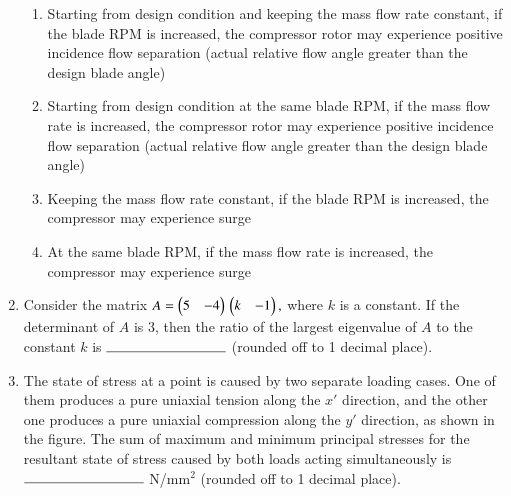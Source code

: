 \documentclass[journal,12pt,onecolumn]{IEEEtran}
\theoremstyle{remark}
\begin{document}
\begin{enumerate}
    \begin{enumerate}
        \item Starting from design condition and keeping the mass flow rate constant, if the blade RPM is increased, the compressor rotor may experience positive incidence flow separation (actual relative flow angle greater than the design blade angle)
        \item Starting from design condition at the same blade RPM, if the mass flow rate is increased, the compressor rotor may experience positive incidence flow separation (actual relative flow angle greater than the design blade angle)
        \item Keeping the mass flow rate constant, if the blade RPM is increased, the compressor may experience surge
        \item At the same blade RPM, if the mass flow rate is increased, the compressor may experience surge
    \end{enumerate}
    
    \item Consider the matrix 
    $
    A = \begin{pmatrix} 5 & -4 \end{pmatrix}\\ \begin{pmatrix}k & -1\end{pmatrix} ,
    $
    where $k$ is a constant. If the determinant of $A$ is 3, then the ratio of the largest eigenvalue of $A$ to the constant $k$ is $\rule{3cm}{0.15mm}$ (rounded off to 1 decimal place).
    
    \item The state of stress at a point is caused by two separate loading cases. One of them produces a pure uniaxial tension along the $x'$ direction, and the other one produces a pure uniaxial compression along the $y'$ direction, as shown in the figure. The sum of maximum and minimum principal stresses for the resultant state of stress caused by both loads acting simultaneously is $\rule{3cm}{0.15mm}$ N/mm$^2$ (rounded off to 1 decimal place).
    
    \begin{figure}[H]
        \centering
        
    \end{figure}
    
\end{enumerate}
\end{document}
